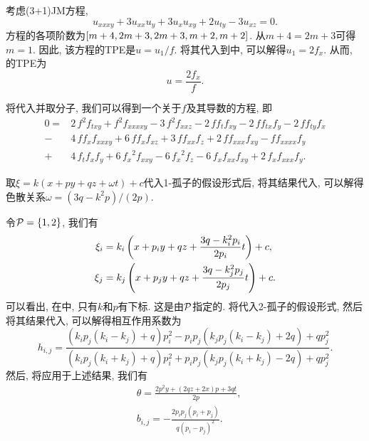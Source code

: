 考虑(3+1)JM方程\CITEcaJM,
\begin{equation}
    u_{xxxy}+3u_{xx}u_y+3u_{x}u_{xy}+2u_{ty}-3u_{xz}=0. \label{JMEQ3}
\end{equation}
方程的各项阶数为$\left[m+4,2m+3,2m+3,m+2,m+2\right]$. 从$m+4=2m+3$可得$m=1$. 因此, 该方程的TPE是$u=u_1/f$. 将其代入到中, 可以解得$u_1=2f_x$. 从而, 的TPE为 
\begin{equation}
u=\frac{2f_x}{f}. \label{JMEQ-tr}    
\end{equation}

将代入并取分子, 我们可以得到一个关于$f$及其导数的方程, 即 
\begin{equation}
\begin{split}
0=&2\,{f}^{2}f_{{{ txy}}}+{f}^{2}f_{{{ xxxxy}}}-3\,{f}^{2}f_{{{ xxz}}}-2\,ff_{{t}}f_{{{ xy}}}-2\,ff_{{{ tx}}}f_{{y}}-2\,ff_{{{ ty}}}f_{{x}}\\
-&4\,ff_{{x}}f_{{{ xxxy}}}+6\,ff_{{x}}f_{{{ xz}}}+3\,ff_{{{ xx}}}f_{{z}}+2\,ff_{{{ xxx}}}f_{{{xy}}}-ff_{{{ xxxx}}}f_{{y}}\\
+&4\,f_{{t}}f_{{x}}f_{{y}}+6\,{f_{{x}}}^{2}f_{{{ xxy}}}-6\,{f_{{x}}}^{2}f_{{z}}-6\,f_{{x}}f_{{{ xx}}}f_{{{ xy}}}+2\,f_{{x}}f_{{{ xxx}}}f_{{y}}. \label{JMEQ-feq}
\end{split}
\end{equation}

取$\xi=k(x+py+qz+\omega t)+c$代入1-孤子的假设形式后, 将其结果代入, 可以解得色散关系$\omega=(3q-k^2p)/(2p)$.

令$\mathcal{P}=\left\{1,2\right\}$, 我们有
\begin{equation}
\begin{split}
\xi_i&=k_i\left(x+p_iy+qz+\frac{3q-k_i^2p_i}{2p_i}t\right)+c, \\ 
\xi_j&=k_j\left(x+p_jy+qz+\frac{3q-k_j^2p_j}{2p_j}t\right)+c.
\end{split} \label{JMEQ-xij}
\end{equation}
可以看出, 在中, 只有$k$和$p$有下标. 这是由$\mathcal{P}$指定的. 将代入2-孤子的假设形式, 然后将其结果代入, 可以解得相互作用系数为
\begin{equation}
    h_{i,j}=\frac{(k_ip_j(k_i-k_j)+q)p_i^2-p_ip_j(k_jp_j(k_i-k_j)+2q)+qp_j^2}{(k_ip_j(k_i+k_j)+q)p_i^2+p_ip_j(k_jp_j(k_i+k_j)-2q)+qp_j^2}.
\end{equation}
然后, 将应用于上述结果, 我们有
\begin{equation}
\begin{split}
&\theta=\frac{2p^2y+(2qz+2x)p+3qt}{2p}, \\ 
&b_{i,j}=-\frac{2p_ip_j(p_i+p_j)}{q(p_i-p_j)^2}.
\end{split}
\end{equation}

